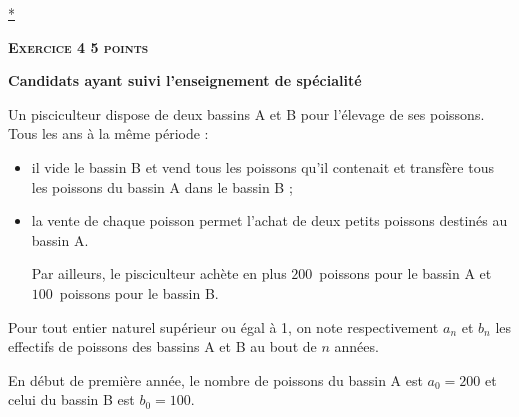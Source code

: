 \documentclass[10pt]{article}
\begin{document}
\hyperlink{Index}{*}
\vspace{0,5cm}

\textbf{\textsc{Exercice 4 \hfill 5 points}}

\textbf{Candidats ayant suivi l'enseignement de spécialité} 

\medskip

Un pisciculteur dispose de deux bassins A et B pour l'élevage de ses poissons. Tous les ans à la même période : 

\setlength\parindent{9mm}
\begin{itemize}
\item il vide le bassin B et vend tous les poissons qu'il contenait et transfère tous les poissons du bassin A dans le bassin B ; 
\item la vente de chaque poisson permet l'achat de deux petits poissons destinés au bassin A.

Par ailleurs, le pisciculteur achète en plus $200$~poissons pour le bassin A et $100$~poissons pour le bassin B.
\end{itemize}
\setlength\parindent{0mm} 

Pour tout entier naturel supérieur ou égal à 1, on note respectivement $a_{n}$ et $b_{n}$ les effectifs de poissons des bassins A et B au bout de $n$ années. 

En début de première année, le nombre de poissons du bassin A est $a_{0} = 200$ et celui du bassin B est $b_{0} = 100$. 

\medskip
\end{document}
